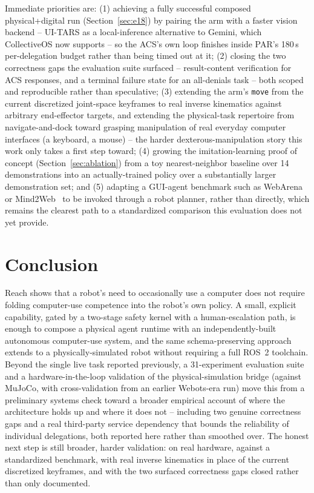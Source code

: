 \documentclass{article}
\begin{document}
Immediate priorities are: (1) achieving a fully successful composed physical+digital run (Section~\ref{sec:e18}) by pairing the arm with a faster vision backend -- UI-TARS as a local-inference alternative to Gemini, which CollectiveOS now supports -- so the ACS's own loop finishes inside PAR's 180\,s per-delegation budget rather than being timed out at it; (2) closing the two correctness gaps the evaluation suite surfaced -- result-content verification for ACS responses, and a terminal failure state for an all-denials task -- both scoped and reproducible rather than speculative; (3) extending the arm's \texttt{move} from the current discretized joint-space keyframes to real inverse kinematics against arbitrary end-effector targets, and extending the physical-task repertoire from navigate-and-dock toward grasping manipulation of real everyday computer interfaces (a keyboard, a mouse) -- the harder dexterous-manipulation story this work only takes a first step toward; (4) growing the imitation-learning proof of concept (Section~\ref{sec:ablation}) from a toy nearest-neighbor baseline over 14 demonstrations into an actually-trained policy over a substantially larger demonstration set; and (5) adapting a GUI-agent benchmark such as WebArena~\citep{zhou2024webarena} or Mind2Web~\citep{deng2023mind2web} to be invoked through a robot planner, rather than directly, which remains the clearest path to a standardized comparison this evaluation does not yet provide.


\section{Conclusion}
\label{sec:conclusion}

Reach shows that a robot's need to occasionally use a computer does not require folding computer-use competence into the robot's own policy. A small, explicit capability, gated by a two-stage safety kernel with a human-escalation path, is enough to compose a physical agent runtime with an independently-built autonomous computer-use system, and the same schema-preserving approach extends to a physically-simulated robot without requiring a full ROS~2 toolchain. Beyond the single live task reported previously, a 31-experiment evaluation suite and a hardware-in-the-loop validation of the physical-simulation bridge (against MuJoCo, with cross-validation from an earlier Webots-era run) move this from a preliminary systems check toward a broader empirical account of where the architecture holds up and where it does not -- including two genuine correctness gaps and a real third-party service dependency that bounds the reliability of individual delegations, both reported here rather than smoothed over. The honest next step is still broader, harder validation: on real hardware, against a standardized benchmark, with real inverse kinematics in place of the current discretized keyframes, and with the two surfaced correctness gaps closed rather than only documented.
\end{document}
